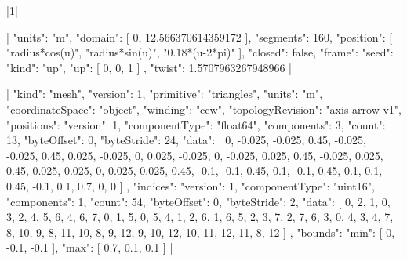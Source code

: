 \documentclass{article}
\begin{document}
\TLSetup{\usepackage{cmbright}}
|1|

|{
  "units": "m",
  "domain": [
    0,
    12.566370614359172
  ],
  "segments": 160,
  "position": [
    "radius*cos(u)",
    "radius*sin(u)",
    "0.18*(u-2*pi)"
  ],
  "closed": false,
  "frame": {
    "seed": {
      "kind": "up",
      "up": [
        0,
        0,
        1
      ]
    },
    "twist": 1.5707963267948966
  }
}|

|{
  "kind": "mesh",
  "version": 1,
  "primitive": "triangles",
  "units": "m",
  "coordinateSpace": "object",
  "winding": "ccw",
  "topologyRevision": "axis-arrow-v1",
  "positions": {
    "version": 1,
    "componentType": "float64",
    "components": 3,
    "count": 13,
    "byteOffset": 0,
    "byteStride": 24,
    "data": [
      0,
      -0.025,
      -0.025,
      0.45,
      -0.025,
      -0.025,
      0.45,
      0.025,
      -0.025,
      0,
      0.025,
      -0.025,
      0,
      -0.025,
      0.025,
      0.45,
      -0.025,
      0.025,
      0.45,
      0.025,
      0.025,
      0,
      0.025,
      0.025,
      0.45,
      -0.1,
      -0.1,
      0.45,
      0.1,
      -0.1,
      0.45,
      0.1,
      0.1,
      0.45,
      -0.1,
      0.1,
      0.7,
      0,
      0
    ]
  },
  "indices": {
    "version": 1,
    "componentType": "uint16",
    "components": 1,
    "count": 54,
    "byteOffset": 0,
    "byteStride": 2,
    "data": [
      0,
      2,
      1,
      0,
      3,
      2,
      4,
      5,
      6,
      4,
      6,
      7,
      0,
      1,
      5,
      0,
      5,
      4,
      1,
      2,
      6,
      1,
      6,
      5,
      2,
      3,
      7,
      2,
      7,
      6,
      3,
      0,
      4,
      3,
      4,
      7,
      8,
      10,
      9,
      8,
      11,
      10,
      8,
      9,
      12,
      9,
      10,
      12,
      10,
      11,
      12,
      11,
      8,
      12
    ]
  },
  "bounds": {
    "min": [
      0,
      -0.1,
      -0.1
    ],
    "max": [
      0.7,
      0.1,
      0.1
    ]
  }
}|
\end{document}
